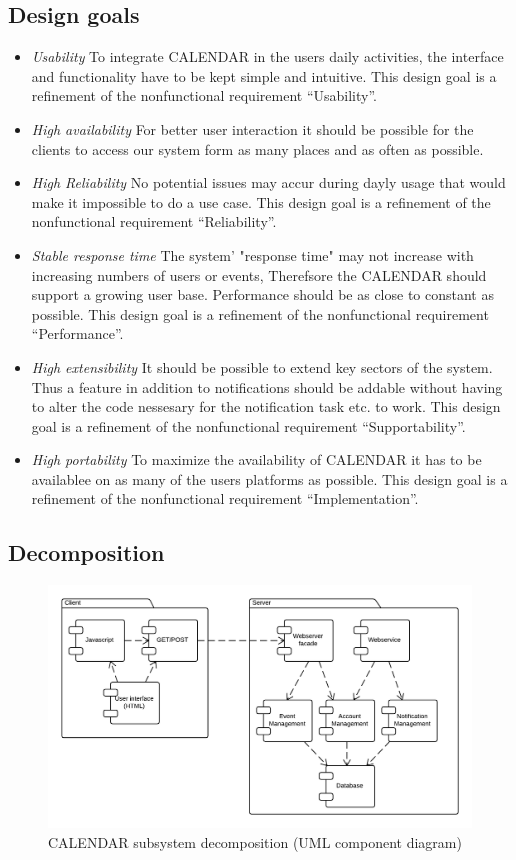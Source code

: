 \documentclass[a4paper]{article}
\begin{document}
\subsection{Design goals}

\begin{itemize}
\item \textit{Usability}
To integrate CALENDAR in the users daily activities, the interface and functionality have to be kept simple and intuitive. This design goal is a refinement of the nonfunctional requirement “Usability”.
\item \textit{High availability}
For better user interaction it should be possible for the clients to access our system form as many places and as often as possible.
\item \textit{High Reliability}
No potential issues may accur during dayly usage that would make it impossible to do a use case. This design goal is a refinement of the nonfunctional requirement “Reliability”.
\item \textit{Stable response time}
The system' "response time" may not increase with increasing numbers of users or events, Therefsore the CALENDAR should support a growing user base. Performance should be as close to constant  as possible. This design goal is a refinement of the nonfunctional requirement “Performance”.
\item \textit{High extensibility}
It should be possible to extend key sectors of the system. Thus a feature in addition to notifications should be addable without having
to alter the code nessesary for the notification task etc. to work. This design goal is a refinement of the nonfunctional requirement “Supportability”.
\item \textit{High portability}
To maximize the availability of CALENDAR it has to be availablee on as many of the users platforms as possible. This design goal is a refinement of the nonfunctional requirement “Implementation”.
\end{itemize}

\subsection{Decomposition}

\begin{figure}
\includegraphics[scale = 0.3]{Subsystems.png}
\caption{CALENDAR subsystem decomposition (UML component diagram)}
\label{fig:decomposition}  %
\end{figure}
\end{document}
